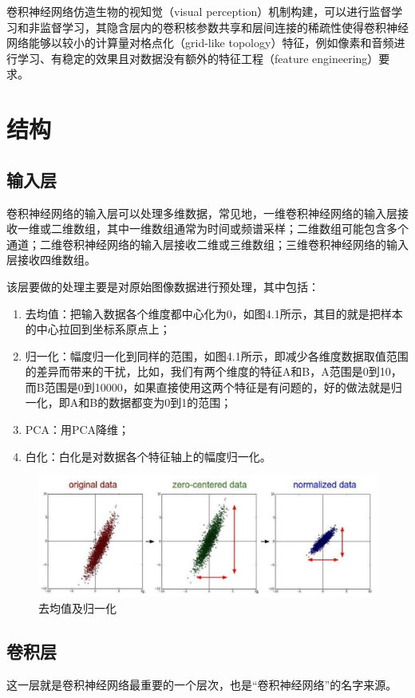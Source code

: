 \documentclass[UTF8, a4paper, 12pt]{report}
\begin{document}
		卷积神经网络仿造生物的视知觉（visual perception）机制构建，可以进行监督学习和非监督学习，其隐含层内的卷积核参数共享和层间连接的稀疏性使得卷积神经网络能够以较小的计算量对格点化（grid-like topology）特征，例如像素和音频进行学习、有稳定的效果且对数据没有额外的特征工程（feature engineering）要求。

	\section{结构}
		\subsection{输入层}
		卷积神经网络的输入层可以处理多维数据，常见地，一维卷积神经网络的输入层接收一维或二维数组，其中一维数组通常为时间或频谱采样；二维数组可能包含多个通道；二维卷积神经网络的输入层接收二维或三维数组；三维卷积神经网络的输入层接收四维数组。

		该层要做的处理主要是对原始图像数据进行预处理，其中包括：
		\begin{enumerate}[itemindent=1em]
			\renewcommand{\labelenumi}{\theenumi)}
			\item 去均值：把输入数据各个维度都中心化为0，如图4.1所示，其目的就是把样本的中心拉回到坐标系原点上；
			\item 归一化：幅度归一化到同样的范围，如图4.1所示，即减少各维度数据取值范围的差异而带来的干扰，比如，我们有两个维度的特征A和B，A范围是0到10，而B范围是0到10000，如果直接使用这两个特征是有问题的，好的做法就是归一化，即A和B的数据都变为0到1的范围；
			\item PCA：用PCA降维；
			\item 白化：白化是对数据各个特征轴上的幅度归一化。
		\end{enumerate}
		\begin{figure}[!h]
		\centering
		\includegraphics[scale=0.45]{./img/Norm.eps}
		\caption{去均值及归一化}
		\label{fig:4.1}
		\end{figure}

		\subsection{卷积层}
			这一层就是卷积神经网络最重要的一个层次，也是“卷积神经网络”的名字来源。
	
\end{document}
